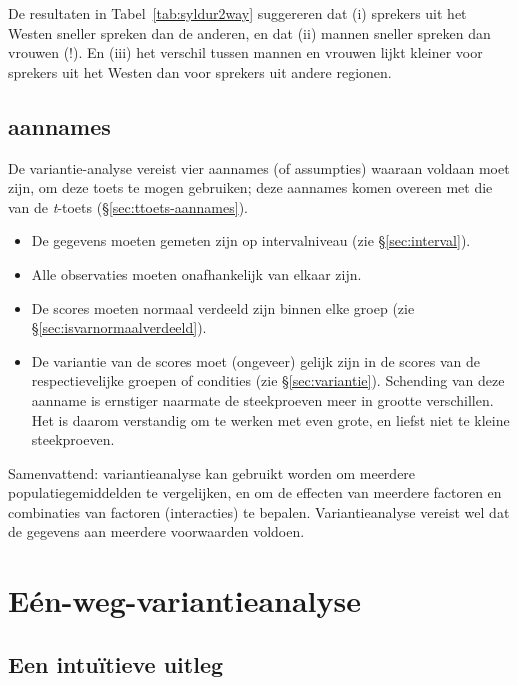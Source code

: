\documentclass[
]{book}
\begin{document}
De resultaten in Tabel~\ref{tab:syldur2way} suggereren dat (i) sprekers uit het Westen
sneller spreken dan de anderen, en dat (ii) mannen sneller spreken dan
vrouwen (!). En (iii) het verschil tussen mannen en vrouwen lijkt
kleiner voor sprekers uit het Westen dan voor sprekers uit andere
regionen.

\hypertarget{aannames}{%
\subsection{aannames}\label{aannames}}

De variantie-analyse vereist vier aannames (of assumpties) waaraan
voldaan moet zijn, om deze toets te mogen gebruiken; deze aannames komen
overeen met die van de \emph{t}-toets
(§\ref{sec:ttoets-aannames}).

\begin{itemize}
\item
  De gegevens moeten gemeten zijn op intervalniveau (zie
  §\ref{sec:interval}).
\item
  Alle observaties moeten onafhankelijk van elkaar zijn.
\item
  De scores moeten normaal verdeeld zijn
  binnen elke groep (zie §\ref{sec:isvarnormaalverdeeld}).
\item
  De variantie van de scores moet (ongeveer) gelijk zijn in de
  scores van de respectievelijke groepen of condities (zie
  §\ref{sec:variantie}).
  Schending van deze aanname is ernstiger
  naarmate de steekproeven meer in grootte verschillen. Het is daarom
  verstandig om te werken met even grote, en liefst niet te kleine
  steekproeven.
\end{itemize}

Samenvattend: variantieanalyse kan gebruikt worden om meerdere
populatiegemiddelden te vergelijken, en om de effecten van meerdere
factoren en combinaties van factoren (interacties) te bepalen.
Variantieanalyse vereist wel dat de gegevens aan meerdere voorwaarden
voldoen.

\hypertarget{euxe9n-weg-variantieanalyse}{%
\section{Eén-weg-variantieanalyse}\label{euxe9n-weg-variantieanalyse}}

\hypertarget{sec:anova-oneway-uitleg}{%
\subsection{Een intuïtieve uitleg}\label{sec:anova-oneway-uitleg}}
\end{document}
